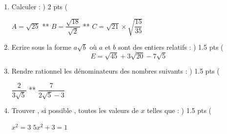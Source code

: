 \documentclass[10pt,a4paper]{article}
\begin{document}
\begin{ascolorbox14}{}
\vspace*{-0.045\linewidth}
\begin{exo}[colbacktitle=blue!40 ]{\textcolor{ white}{
{}}}
\begin{enumerate}   \setlength{\itemsep}{1pt}
  \setlength{\parskip}{0pt}
  \setlength{\parsep}{0pt}
\item Calculer   : { \Timeffont \dotfill  } { \Maghrfont ) 2 \sfont pts  \Maghrfont ( }
\vspace{-0.3cm}
\begin{tabenum}
\tabenumitem[] \qquad \;
\tabenumitem[]   $ A = \sqrt{25} $
\tabenumitem[] **
\tabenumitem[]  $ B = \dfrac{\sqrt{18}}{\sqrt{2}} $
\tabenumitem[] **
\tabenumitem[]  $ C= \sqrt{21} \times \sqrt{\dfrac{15}{35}} $ 
\end{tabenum} \vspace{-0.3cm}
\item Ecrire sous la forme $ a\sqrt{b} $ où $a$ et $b$ sont des entiers relatifs : { \Timeffont \dotfill  } { \Maghrfont ) 1.5 \sfont pts  \Maghrfont ( }
\[ E = \sqrt{45}  +    3\sqrt{20} - 7\sqrt{5} \]
\item Rendre rationnel les dénominateurs des nombres suivants  : { \Timeffont \dotfill  } { \Maghrfont ) 1.5 \sfont pts  \Maghrfont ( }
\vspace{-0.3cm}
\begin{tabenum}
\tabenumitem[] \qquad \; \; \; \; 
\tabenumitem[] \qquad \;\;
\tabenumitem[] \qquad \;
\tabenumitem[] $  \dfrac{2}{3\sqrt{5}} $
\tabenumitem[] **
\tabenumitem[]  $ \dfrac{7}{2\sqrt{5}-3}  $ 
\end{tabenum} \vspace{-0.4cm} 
\item  Trouver , si possible , toutes les valeurs de $x$ telles que : { \Timeffont \dotfill  } { \Maghrfont ) 1.5 \sfont pts  \Maghrfont ( }
\begin{tabenum} 
\tabenumitem[] \qquad \;  
\tabenumitem[] \qquad \;
\tabenumitem[] \qquad \;
\tabenumitem[]  $ x^{2} =3 $
\tabenumitem[] 
\tabenumitem[**]
\tabenumitem[] 
\tabenumitem[] $ 5x^{2} + 3  = 1 $
\end{tabenum}
\end{enumerate}
\end{exo}
\vspace*{-0.008\linewidth}
\begin{exo}[colbacktitle=blue!40 ]{\textcolor{ white}{
{}}}

\end{exo}
\end{ascolorbox14}
\end{document}
